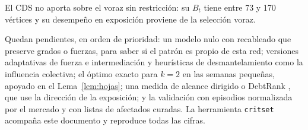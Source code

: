 \documentclass[journal]{IEEEtran}
\begin{document}
El CDS no aporta sobre el voraz sin restricción: su $B_t$ tiene entre 73 y 170
vértices y su desempeño en exposición proviene de la selección voraz.

Quedan pendientes, en orden de prioridad: un modelo nulo con recableado que
preserve grados o fuerzas, para saber si el patrón es propio de esta red;
versiones adaptativas de fuerza e intermediación y heurísticas de
desmantelamiento como la influencia colectiva; el óptimo exacto para $k=2$ en
las semanas pequeñas, apoyado en el Lema~\ref{lem:hojas}; una medida de
alcance dirigido o DebtRank \cite{battiston2012debtrank}, que use la dirección
de la exposición; y la validación con episodios normalizada por el mercado y
con listas de afectados curadas. La herramienta \texttt{critset} acompaña este
documento y reproduce todas las cifras.





\end{document}
